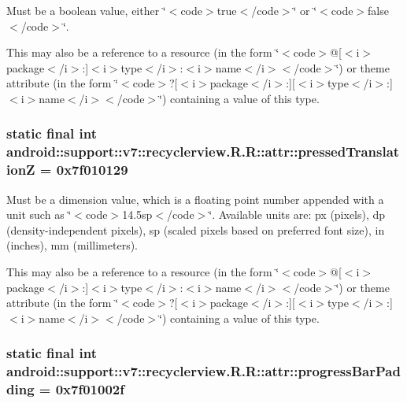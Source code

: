 Must be a boolean value, either \char`\"{}$<$code$>$true$<$/code$>$\char`\"{} or \char`\"{}$<$code$>$false$<$/code$>$\char`\"{}. 

This may also be a reference to a resource (in the form \char`\"{}$<$code$>$@\mbox{[}$<$i$>$package$<$/i$>$:\mbox{]}$<$i$>$type$<$/i$>$:$<$i$>$name$<$/i$>$$<$/code$>$\char`\"{}) or theme attribute (in the form \char`\"{}$<$code$>$?\mbox{[}$<$i$>$package$<$/i$>$:\mbox{]}\mbox{[}$<$i$>$type$<$/i$>$:\mbox{]}$<$i$>$name$<$/i$>$$<$/code$>$\char`\"{}) containing a value of this type. \hypertarget{classandroid_1_1support_1_1v7_1_1recyclerview_1_1_r_1_1attr_0921252cb47f1868b80177d382837d6b}{
\subsubsection[{pressedTranslationZ}]{\setlength{\rightskip}{0pt plus 5cm}static final int android::support::v7::recyclerview.R.R::attr::pressedTranslationZ = 0x7f010129}}
\label{classandroid_1_1support_1_1v7_1_1recyclerview_1_1_r_1_1attr_0921252cb47f1868b80177d382837d6b}


Must be a dimension value, which is a floating point number appended with a unit such as \char`\"{}$<$code$>$14.5sp$<$/code$>$\char`\"{}. Available units are: px (pixels), dp (density-independent pixels), sp (scaled pixels based on preferred font size), in (inches), mm (millimeters). 

This may also be a reference to a resource (in the form \char`\"{}$<$code$>$@\mbox{[}$<$i$>$package$<$/i$>$:\mbox{]}$<$i$>$type$<$/i$>$:$<$i$>$name$<$/i$>$$<$/code$>$\char`\"{}) or theme attribute (in the form \char`\"{}$<$code$>$?\mbox{[}$<$i$>$package$<$/i$>$:\mbox{]}\mbox{[}$<$i$>$type$<$/i$>$:\mbox{]}$<$i$>$name$<$/i$>$$<$/code$>$\char`\"{}) containing a value of this type. \hypertarget{classandroid_1_1support_1_1v7_1_1recyclerview_1_1_r_1_1attr_201ce9f69baacb0bae3cc85b515d9030}{
\subsubsection[{progressBarPadding}]{\setlength{\rightskip}{0pt plus 5cm}static final int android::support::v7::recyclerview.R.R::attr::progressBarPadding = 0x7f01002f}}
\label{classandroid_1_1support_1_1v7_1_1recyclerview_1_1_r_1_1attr_201ce9f69baacb0bae3cc85b515d9030}


